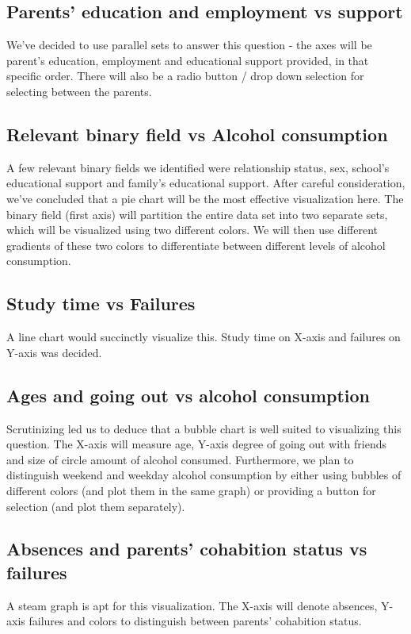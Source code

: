 \documentclass[titlepage, 12pt]{article}
\begin{document}
\subsection{Parents' education and employment vs support}
We've decided to use parallel sets to answer this question - the axes will be
parent's education, employment and educational support provided, in that
specific order. There will also be a radio button / drop down selection for
selecting between the parents.

\subsection{Relevant binary field vs Alcohol consumption}
A few relevant binary fields we identified were relationship status, sex,
school's educational support and family's educational support.  After careful
consideration, we've concluded that a pie chart will be the most effective
visualization here. The binary field (first axis) will partition the entire data
set into two separate sets, which will be visualized using two different colors.
We will then use different gradients of these two colors to differentiate
between different levels of alcohol consumption.

\subsection{Study time vs Failures}
A line chart would succinctly visualize this. Study time on X-axis and failures
on Y-axis was decided.

\subsection{Ages and going out vs alcohol consumption}
Scrutinizing led us to deduce that a bubble chart is well suited to visualizing
this question. The X-axis will measure age, Y-axis degree of going out with
friends and size of circle amount of alcohol consumed. Furthermore, we plan to
distinguish weekend and weekday alcohol consumption by either using bubbles of
different colors (and plot them in the same graph) or providing a button for
selection (and plot them separately).

\subsection{Absences and parents' cohabition status vs failures}
A steam graph is apt for this visualization. The X-axis will denote absences,
Y-axis failures and colors to distinguish between parents' cohabition status.
\end{document}
